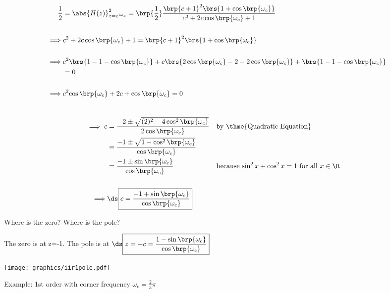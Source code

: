 {\begin{align*}
  \frac{1}{2}
    &= \abs{H(z)}^2_{z=e^{i\omega_c}}
     = \brp{\frac{1}{2}}
       \frac{\brp{c+1}^2\brs{1 +  \cos\brp{\omega_c}}}
            {c^2 + 2 c\cos\brp{\omega_c} + 1} 
  \\\\\implies &c^2 + 2 c\cos\brp{\omega_c} + 1 
             = \brp{c+1}^2\brs{1 +  \cos\brp{\omega_c}}
  \\\\\implies & c^2\brs{1-1-\cos\brp{\omega_c}} 
             + c  \brs{2\cos\brp{\omega_c}-2-2\cos\brp{\omega_c}}
             +    \brs{1-1-\cos\brp{\omega_c}}
             \\&= 0
  \\\\\implies & c^2{\cos\brp{\omega_c}} 
             + 2c
             +    {\cos\brp{\omega_c}}
             = 0
\end{align*}}



{\begin{align*}
  \\\implies c &= \frac{-2 \pm \sqrt{(2)^2 -4\cos^2\brp{\omega_c}}}
                       {2\cos\brp{\omega_c}}
               && \text{by \thme{Quadratic Equation}}
             \\&= \frac{-1 \pm \sqrt{1 -\cos^2\brp{\omega_c}}}
                       {\cos\brp{\omega_c}}
             \\&= \frac{-1 \pm \sin\brp{\omega_c}}
                       {\cos\brp{\omega_c}}
               && \text{because $\sin^2x + \cos^2x = 1$ for all $x\in\R$}
  \\
  \\\implies &\ds\boxed{c = \frac{-1 + \sin\brp{\omega_c}}
                    {\cos\brp{\omega_c}}}
\end{align*}}

Where is the zero? Where is the pole?

The zero is at z=-1. \qquad The pole is at 
$\ds\boxed{z=-c = \frac{1 - \sin\brp{\omega_c}}
                    {\cos\brp{\omega_c}}}$

\texttt{[image: graphics/iir1pole.pdf]}

Example: 1st order  with corner frequency $\omega_c=\frac{2}{3}\pi$

